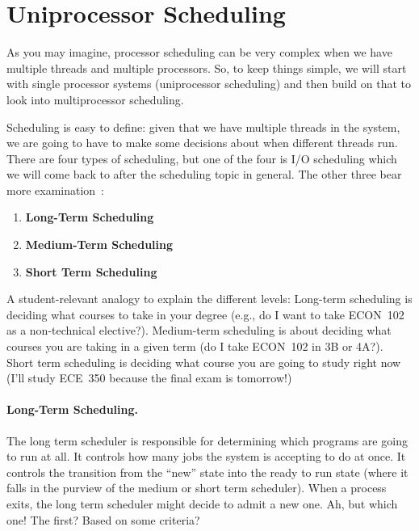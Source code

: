 




\section*{Uniprocessor Scheduling}

As you may imagine, processor scheduling can be very complex when we have multiple threads and multiple processors. So, to keep things simple, we will start with single processor systems (uniprocessor scheduling) and then build on that to look into multiprocessor scheduling.

Scheduling is easy to define: given that we have multiple threads in the system, we are going to have to make some decisions about when different threads run. There are four types of scheduling, but one of the four is I/O scheduling which we will come back to after the scheduling topic in general. The other three bear more examination~\cite{osi}:

\begin{enumerate}
	\item \textbf{Long-Term Scheduling}
	\item \textbf{Medium-Term Scheduling}
	\item \textbf{Short Term Scheduling}
\end{enumerate}

A student-relevant analogy to explain the different levels: Long-term scheduling is deciding what courses to take in your degree (e.g., do I want to take ECON~102 as a non-technical elective?). Medium-term scheduling is about deciding what courses you are taking in a given term (do I take ECON~102 in 3B or 4A?). Short term scheduling is deciding what course you are going to study right now (I'll study ECE~350 because the final exam is tomorrow!)

\paragraph{Long-Term Scheduling.}

The long term scheduler is responsible for determining which programs are going to run at all. It controls how many jobs the system is accepting to do at once. It controls the transition from the ``new'' state into the ready to run state (where it falls in the purview of the medium or short term scheduler). When a process exits, the long term scheduler might decide to admit a new one. Ah, but which one! The first? Based on some criteria?

